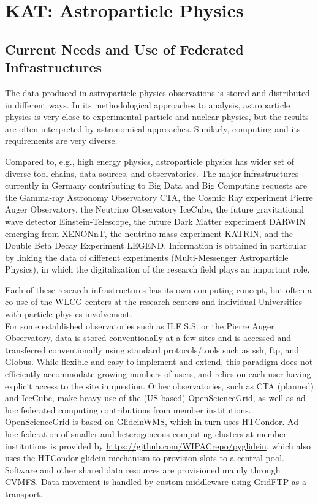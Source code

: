\section{KAT: Astroparticle Physics} 


\subsection{Current Needs and Use of Federated Infrastructures}

The data produced in astroparticle physics observations is stored and 
distributed in different ways. 
In its methodological approaches to analysis, astroparticle physics is very close to experimental particle and nuclear physics, but the results are often interpreted by astronomical approaches. Similarly, computing and its requirements are very diverse. 

Compared to, e.g., high energy physics, astroparticle physics has
wider set of diverse tool chains, data sources, and observatories.
The major infrastructures currently in Germany contributing to Big Data and Big Computing requests are the Gamma-ray Astronomy
Observatory CTA, the Cosmic Ray experiment Pierre Auger Observatory,
the Neutrino Observatory IceCube, the future gravitational wave detector Einstein-Telescope, the future Dark Matter experiment DARWIN emerging from XENONnT, the neutrino mass experiment KATRIN, and the Double Beta Decay
Experiment LEGEND. 
Information is obtained in particular by linking the
data of different experiments (Multi-Messenger Astroparticle Physics), in
which the digitalization of the research field plays an important role. 

Each of these research infrastructures has its own computing concept, but often a co-use of the WLCG centers at the research centers and individual Universities with particle physics involvement.  \\

 
For some established observatories such as H.E.S.S. or the Pierre Auger Observatory, data is stored conventionally at a few sites and is accessed and transferred conventionally using standard protocols/tools such as ssh, ftp, and Globus. 
While flexible and easy to implement and extend,
this paradigm does not efficiently accommodate growing numbers of users,
and relies on each user having explicit access to the site in question. 
Other observatories, such as CTA (planned) and IceCube, make heavy use of the (US-based) OpenScienceGrid, as well as ad-hoc federated computing contributions from member institutions. 
OpenScienceGrid is based on GlideinWMS, which in turn uses HTCondor. 
Ad-hoc federation of smaller and heterogeneous computing clusters at member institutions is provided by \url{https://github.com/WIPACrepo/pyglidein}, which also uses the HTCondor glidein mechanism to provision slots to a central pool.
Software and other shared data resources are provisioned mainly through
CVMFS. Data movement is handled by custom middleware using GridFTP as a transport. \\


